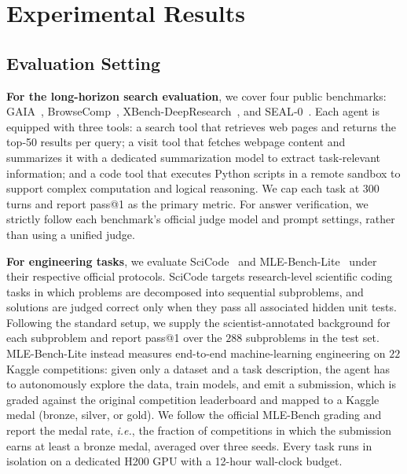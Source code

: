 \section{Experimental Results}
\label{sec:exp}

\subsection{Evaluation Setting} 
\textbf{For the long-horizon search evaluation}, we cover four public benchmarks: GAIA~\citep{gaia}, BrowseComp~\citep{browsecomp}, XBench-DeepResearch~\citep{xbench}, and SEAL‑0~\citep{sealqa}. Each agent is equipped with three tools: a search tool that retrieves web pages and returns the top‑50 results per query; a visit tool that fetches webpage content and summarizes it with a dedicated summarization model to extract task‑relevant information; and a code tool that executes Python scripts in a remote sandbox to support complex computation and logical reasoning. We cap each task at 300 turns and report pass@1 as the primary metric. For answer verification, we strictly follow each benchmark's official judge model and prompt settings, rather than using a unified judge.

\textbf{For engineering tasks}, we evaluate SciCode~\citep{scicode} and MLE-Bench-Lite~\citep{mlebench} under their respective official protocols. SciCode targets research-level scientific coding tasks in which problems are decomposed into sequential subproblems, and solutions are judged correct only when they pass all associated hidden unit tests. Following the standard setup, we supply the scientist-annotated background for each subproblem and report pass@1 over the $288$ subproblems in the test set. MLE-Bench-Lite instead measures end-to-end machine-learning engineering on $22$ Kaggle competitions: given only a dataset and a task description, the agent has to autonomously explore the data, train models, and emit a submission, which is graded against the original competition leaderboard and mapped to a Kaggle medal (bronze, silver, or gold). We follow the official MLE-Bench grading and report the medal rate, \textit{i.e.}, the fraction of competitions in which the submission earns at least a bronze medal, averaged over three seeds. Every task runs in isolation on a dedicated H200 GPU with a 12-hour wall-clock budget.

